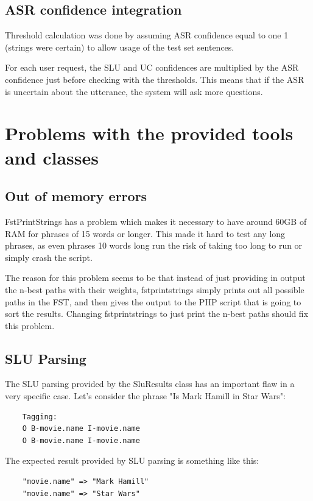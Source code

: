 \documentclass[11pt,a4paper]{article}
\begin{document}
\subsection{ASR confidence integration}
Threshold calculation was done by assuming ASR confidence equal to one 1 (strings were certain) to allow usage of the test set sentences.

For each user request, the SLU and UC confidences are multiplied by the ASR confidence just before checking with the thresholds. This means that if the ASR is uncertain about the utterance, the system will ask more questions.

\section{Problems with the provided tools and classes}
\subsection{Out of memory errors}
FstPrintStrings has a problem which makes it necessary to have around 60GB of RAM for phrases of 15 words or longer. This made it hard to test any long phrases, as even phrases 10 words long run the risk of taking too long to run or simply crash the script.

The reason for this problem seems to be that instead of just providing in output the n-best paths with their weights, fstprintstrings simply prints out all possible paths in the FST, and then gives the output to the PHP script that is going to sort the results. Changing fstprintstrings to just print the n-best paths should fix this problem.

\subsection{SLU Parsing}
The SLU parsing provided by the SluResults class has an important flaw in a very specific case. Let's consider the phrase "Is Mark Hamill in Star Wars":

\begin{verbatim}
	Tagging:
	O B-movie.name I-movie.name
	O B-movie.name I-movie.name
\end{verbatim}

The expected result provided by SLU parsing is something like this:

\begin{verbatim}
	"movie.name" => "Mark Hamill"
	"movie.name" => "Star Wars"
\end{verbatim}
\end{document}
